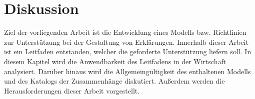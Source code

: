 \chapter{Diskussion}

Ziel der vorliegenden Arbeit ist die Entwicklung eines Modells bzw. Richtlinien zur Unterstützung bei der Gestaltung von Erklärungen. Innerhalb dieser Arbeit ist ein Leitfaden entstanden, welcher die geforderte Unterstützung liefern soll. In diesem Kapitel wird die Anwendbarkeit des Leitfadens in der Wirtschaft analysiert. Darüber hinaus wird die Allgemeingültigkeit des enthaltenen Modells und des Katalogs der Zusammenhänge diskutiert. Außerdem werden die Herausforderungen dieser Arbeit vorgestellt.





